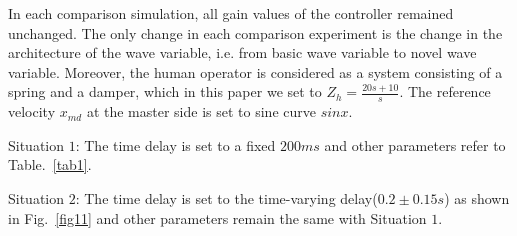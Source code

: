 \par In each comparison simulation,
all gain values of the controller remained unchanged.
The only change in each comparison experiment is the change in the architecture of the wave variable,
i.e. from basic wave variable to novel wave variable.
Moreover,
the human operator is considered as a system consisting of a spring and a damper, 
which in this paper we set to $Z_h=\frac{20s+10}{s}$.
The reference velocity $x_{md}$ at the master side is set to sine curve $sinx$.

\par Situation $1$: The time delay is set to a fixed $200ms$
and other parameters refer to Table.~\ref{tab1}.

\par Situation $2$: The time delay is set to the time-varying delay($0.2\pm 0.15s$)
as shown in Fig.~\ref{fig11}
and other parameters remain the same with Situation $1$.


